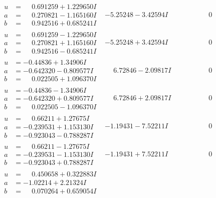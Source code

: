 \documentclass[1p]{elsarticle_modified}
\theoremstyle{definition}
\begin{document}
$$\begin{array}{c|c|c}
\begin{aligned}
u &= \phantom{-}0.691259 + 1.229650 I \\
a &= \phantom{-}0.270821 - 1.165160 I \\
b &= \phantom{-}0.942516 + 0.685241 I\end{aligned}
 & -5.25248 - 3.42594 I & \phantom{-0.000000 } 0 \\ \hline\begin{aligned}
u &= \phantom{-}0.691259 - 1.229650 I \\
a &= \phantom{-}0.270821 + 1.165160 I \\
b &= \phantom{-}0.942516 - 0.685241 I\end{aligned}
 & -5.25248 + 3.42594 I & \phantom{-0.000000 } 0 \\ \hline\begin{aligned}
u &= -0.44836 + 1.34906 I \\
a &= -0.642320 - 0.809577 I \\
b &= \phantom{-}0.022505 + 1.096370 I\end{aligned}
 & \phantom{-}6.72846 - 2.09817 I & \phantom{-0.000000 } 0 \\ \hline\begin{aligned}
u &= -0.44836 - 1.34906 I \\
a &= -0.642320 + 0.809577 I \\
b &= \phantom{-}0.022505 - 1.096370 I\end{aligned}
 & \phantom{-}6.72846 + 2.09817 I & \phantom{-0.000000 } 0 \\ \hline\begin{aligned}
u &= \phantom{-}0.66211 + 1.27675 I \\
a &= -0.239531 + 1.153130 I \\
b &= -0.923043 - 0.788287 I\end{aligned}
 & -1.19431 - 7.52211 I & \phantom{-0.000000 } 0 \\ \hline\begin{aligned}
u &= \phantom{-}0.66211 - 1.27675 I \\
a &= -0.239531 - 1.153130 I \\
b &= -0.923043 + 0.788287 I\end{aligned}
 & -1.19431 + 7.52211 I & \phantom{-0.000000 } 0 \\ \hline\begin{aligned}
u &= \phantom{-}0.450658 + 0.322883 I \\
a &= -1.02214 + 2.21324 I \\
b &= \phantom{-}0.070264 + 0.659054 I\end{aligned}

\end{array}$$
\end{document}
